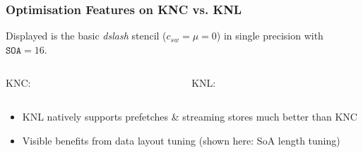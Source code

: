 \documentclass{beamer}
\begin{document}

  \begin{frame}
    \frametitle{Optimisation Features on KNC vs. KNL}
    \footnotesize

    {\tiny
    Displayed is the basic \textit{dslash} stencil ($c_{sw}=\mu=0$) in single precision
    with $\texttt{SOA}=16$.}

    \begin{columns}[T]
      \begin{column}{.5\textwidth}
        \begin{center}
          KNC:\\
          \vfill
        \end{center}
      \end{column}
      \begin{column}{.5\textwidth}
        \begin{center}
          KNL:\\
          \vfill
        \end{center}
      \end{column}
    \end{columns}

    \begin{itemize}
      \item KNL natively supports prefetches \& streaming stores much better than KNC
        \vfill
      \item Visible benefits from data layout tuning (shown here: SoA length tuning)
        \vfill
    \end{itemize}

  \end{frame}

\end{document}
